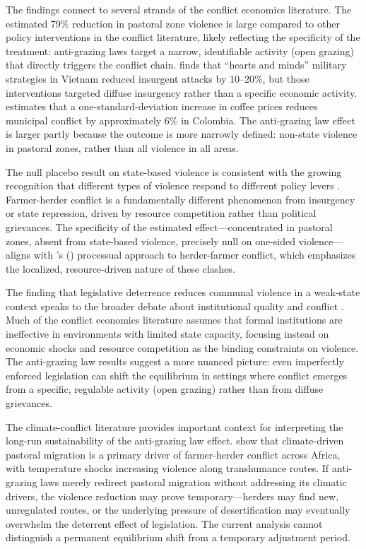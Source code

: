 \documentclass[12pt]{article}
\begin{document}
The findings connect to several strands of the conflict economics literature. The estimated 79\% reduction in pastoral zone violence is large compared to other policy interventions in the conflict literature, likely reflecting the specificity of the treatment: anti-grazing laws target a narrow, identifiable activity (open grazing) that directly triggers the conflict chain. \citet{dell2018nation} finds that ``hearts and minds'' military strategies in Vietnam reduced insurgent attacks by 10--20\%, but those interventions targeted diffuse insurgency rather than a specific economic activity. \citet{dube2013commodity} estimates that a one-standard-deviation increase in coffee prices reduces municipal conflict by approximately 6\% in Colombia. The anti-grazing law effect is larger partly because the outcome is more narrowly defined: non-state violence in pastoral zones, rather than all violence in all areas.

The null placebo result on state-based violence is consistent with the growing recognition that different types of violence respond to different policy levers \citep{blattman2010civil}. Farmer-herder conflict is a fundamentally different phenomenon from insurgency or state repression, driven by resource competition rather than political grievances. The specificity of the estimated effect---concentrated in pastoral zones, absent from state-based violence, precisely null on one-sided violence---aligns with \citeauthor{moritz2010understanding}'s (\citeyear{moritz2010understanding}) processual approach to herder-farmer conflict, which emphasizes the localized, resource-driven nature of these clashes.

The finding that legislative deterrence reduces communal violence in a weak-state context speaks to the broader debate about institutional quality and conflict \citep{acemoglu2001colonial, north1991institutions}. Much of the conflict economics literature assumes that formal institutions are ineffective in environments with limited state capacity, focusing instead on economic shocks and resource competition as the binding constraints on violence. The anti-grazing law results suggest a more nuanced picture: even imperfectly enforced legislation can shift the equilibrium in settings where conflict emerges from a specific, regulable activity (open grazing) rather than from diffuse grievances.

The climate-conflict literature provides important context for interpreting the long-run sustainability of the anti-grazing law effect. \citet{mcguirk2025transhumant} show that climate-driven pastoral migration is a primary driver of farmer-herder conflict across Africa, with temperature shocks increasing violence along transhumance routes. If anti-grazing laws merely redirect pastoral migration without addressing its climatic drivers, the violence reduction may prove temporary---herders may find new, unregulated routes, or the underlying pressure of desertification may eventually overwhelm the deterrent effect of legislation. The current analysis cannot distinguish a permanent equilibrium shift from a temporary adjustment period.
\end{document}
